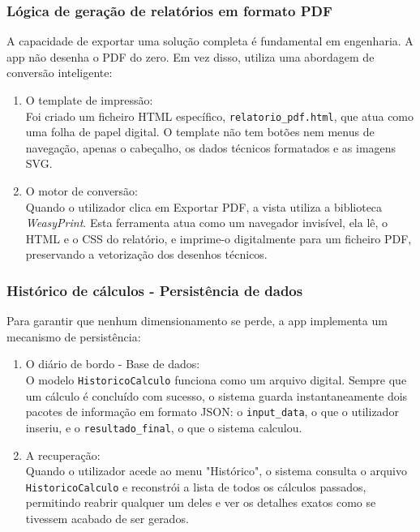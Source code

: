 {\subsubsection{Lógica de geração de relatórios em  formato PDF}
A capacidade de exportar uma solução completa é fundamental em engenharia. A app não desenha o PDF do zero. Em vez disso, utiliza uma abordagem de conversão inteligente:
\begin{enumerate}
    \item O template de impressão:\\
    Foi criado um ficheiro HTML específico, \texttt{relatorio\_pdf.html}, que atua como uma folha de papel digital. O template não tem botões nem menus de navegação, apenas o cabeçalho, os dados técnicos formatados e as imagens SVG.
    \item O motor de conversão:\\
    Quando o utilizador clica em Exportar PDF, a vista utiliza a biblioteca \textit{WeasyPrint}. Esta ferramenta atua como um navegador invisível, ela lê, o HTML e o CSS do relatório, e imprime-o digitalmente para um ficheiro PDF, preservando a vetorização dos desenhos técnicos.
\end{enumerate}

\subsubsection{Histórico de cálculos - Persistência de dados}
Para garantir que nenhum dimensionamento se perde, a app implementa um mecanismo de persistência:
\begin{enumerate}
    \item O diário de bordo - Base de dados:\\
    O modelo \texttt{HistoricoCalculo} funciona como um arquivo digital. Sempre que um cálculo é concluído com sucesso, o sistema guarda instantaneamente dois pacotes de informação em formato JSON: o \texttt{input\_data}, o que o utilizador inseriu, e o \texttt{resultado\_final}, o que o sistema calculou.
    \item A recuperação:\\
    Quando o utilizador acede ao menu "Histórico", o sistema consulta o arquivo \texttt{HistoricoCalculo} e reconstrói a lista de todos os cálculos passados, permitindo reabrir qualquer um deles e ver os detalhes exatos como se tivessem acabado de ser gerados.
\end{enumerate}

}
